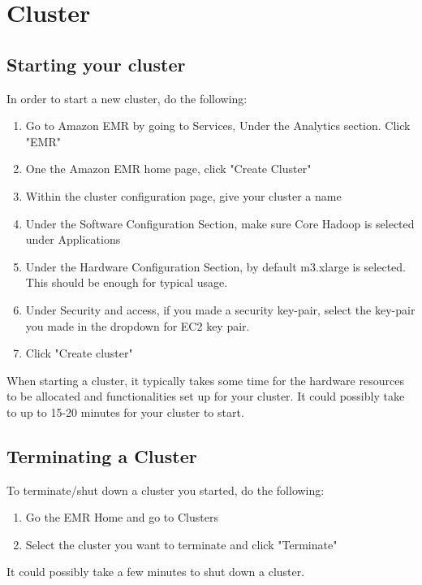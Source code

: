 \documentclass{article}
\begin{document}

\section{Cluster}
\subsection{Starting your cluster}
In order to start a new cluster, do the following:
\begin{enumerate}
    \item Go to Amazon EMR by going to Services,  Under the Analytics section. Click "EMR"
    \item One the Amazon EMR home page, click "Create Cluster"
    \item Within the cluster configuration page, give your cluster a name
    \item Under the Software Configuration Section, make sure Core Hadoop is selected under Applications
    \item Under the Hardware Configuration Section, by default m3.xlarge is selected. This should be enough for typical usage.
    \item Under Security and access, if you made a security key-pair, select the key-pair you made in the dropdown for EC2 key pair.
    \item Click "Create cluster"
\end{enumerate}
\begin{info}
When starting a cluster, it typically takes some time for the hardware resources to be allocated and functionalities set up for your cluster. It could possibly take to up to 15-20 minutes for your cluster to start.
\end{info}
\subsection{Terminating a Cluster}
To terminate/shut down a cluster you started, do the following:
\begin{enumerate}
    \item Go the EMR Home and go to Clusters
    \item Select the cluster you want to terminate and click "Terminate"
\end{enumerate}
\begin{info}
It could possibly take a few minutes to shut down a cluster.
\end{info}
\end{document}
